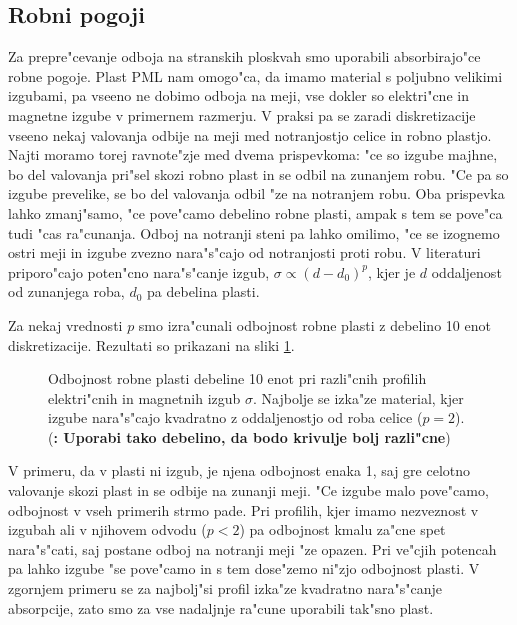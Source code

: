 \documentclass[a4paper,10pt]{article}
\newcommand{\todo}[1]{(\textbf{\textsmaller{TODO}: #1})}
\begin{document}
\subsection{Robni pogoji}
Za prepre"cevanje odboja na stranskih ploskvah smo uporabili absorbirajo"ce robne pogoje. 
Plast \acs{PML} nam omogo"ca, da imamo material s poljubno velikimi izgubami, pa vseeno ne dobimo odboja na meji, vse dokler so elektri"cne in magnetne izgube v primernem razmerju. 
V praksi pa se zaradi diskretizacije vseeno nekaj valovanja odbije na meji med notranjostjo celice in robno plastjo. 
Najti moramo torej ravnote"zje med dvema prispevkoma: "ce so izgube majhne, bo del valovanja pri"sel skozi robno plast in se odbil na zunanjem robu. 
"Ce pa so izgube prevelike, se bo del valovanja odbil "ze na notranjem robu. 
Oba prispevka lahko zmanj"samo, "ce pove"camo debelino robne plasti, ampak s tem se pove"ca tudi "cas ra"cunanja. 
Odboj na notranji steni pa lahko omilimo, "ce se izognemo ostri meji in izgube zvezno nara"s"cajo od notranjosti proti robu. 
V literaturi\cite{taflove} priporo"cajo poten"cno nara"s"canje izgub, $\sigma \propto (d-d_0)^{p}$, kjer je $d$ oddaljenost od zunanjega roba, $d_0$ pa debelina plasti. 

Za nekaj vrednosti $p$ smo izra"cunali odbojnost robne plasti z debelino 10 enot diskretizacije. 
Rezultati so prikazani na sliki \ref{fig:test-absorption}. 

\begin{figure}[!htbp]
 
 \caption{Odbojnost robne plasti debeline 10 enot pri razli"cnih profilih elektri"cnih in magnetnih izgub $\sigma$. Najbolje se izka"ze material, kjer izgube nara"s"cajo kvadratno z oddaljenostjo od roba celice ($p=2$). 
 \todo{Uporabi tako debelino, da bodo krivulje bolj razli"cne}
 }
 \label{fig:test-absorption}
\end{figure}

V primeru, da v plasti ni izgub, je njena odbojnost enaka 1, saj gre celotno valovanje skozi plast in se odbije na zunanji meji. 
"Ce izgube malo pove"camo, odbojnost v vseh primerih strmo pade. 
Pri profilih, kjer imamo nezveznost v izgubah ali v njihovem odvodu ($p<2$) pa odbojnost kmalu za"cne spet nara"s"cati, saj postane odboj na notranji meji "ze opazen.
Pri ve"cjih potencah pa lahko izgube "se pove"camo in s tem dose"zemo ni"zjo odbojnost plasti. 
V zgornjem primeru se za najbolj"si profil izka"ze kvadratno nara"s"canje absorpcije, zato smo za vse nadaljnje ra"cune uporabili tak"sno plast. 
\end{document}
